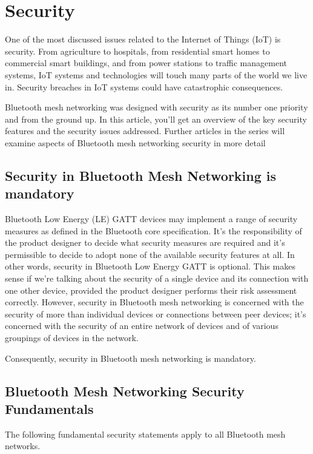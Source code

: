 \documentclass[\main/main.tex]{subfiles}
\begin{document}
\section{Security \cite{web_bluetooth_mesh_security_overview}}
One of the most discussed issues related to the Internet of Things (IoT) is security. From agriculture to hospitals, from residential smart homes to commercial smart buildings, and from power stations to traffic management systems, IoT systems and technologies will touch many parts of the world we live in. Security breaches in IoT systems could have catastrophic consequences.

Bluetooth mesh networking was designed with security as its number one priority and from the ground up. In this article, you’ll get an overview of the key security features and the security issues addressed. Further articles in the series will examine aspects of Bluetooth mesh networking security in more detail

\subsection{Security in Bluetooth Mesh Networking is mandatory}
Bluetooth Low Energy (LE) GATT devices may implement a range of security measures as defined in the Bluetooth core specification. It’s the responsibility of the product designer to decide what security measures are required and it’s permissible to decide to adopt none of the available security features at all. In other words, security in Bluetooth Low Energy GATT is optional. This makes sense if we’re talking about the security of a single device and its connection with one other device, provided the product designer performs their risk assessment correctly. However, security in Bluetooth mesh networking is concerned with the security of more than individual devices or connections between peer devices; it’s concerned with the security of an entire network of devices and of various groupings of devices in the network.

Consequently, security in Bluetooth mesh networking is mandatory.

\subsection{Bluetooth Mesh Networking Security Fundamentals}
The following fundamental security statements apply to all Bluetooth mesh networks.
\end{document}
